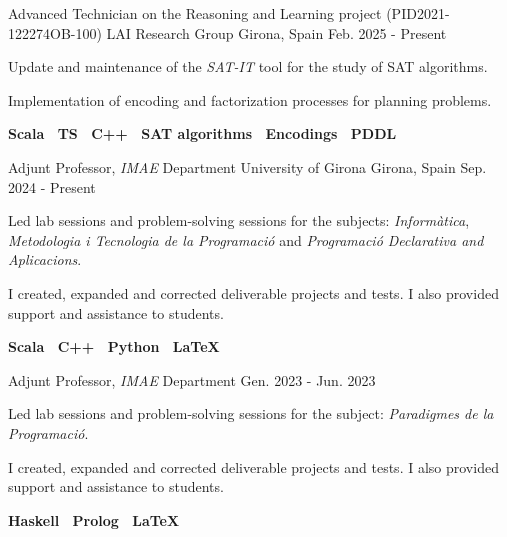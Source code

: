 

\begin{cventries}


  \cventry
  {Advanced Technician on the Reasoning and Learning project (PID2021-122274OB-100)} %
  {LAI Research Group} %
  {Girona, Spain} %
  {Feb. 2025 - Present} %
  {
  \begin{cvitems}
    \item {Update and maintenance of the \textit{SAT-IT} tool for the study of SAT algorithms.}
    \item {Implementation of encoding and factorization processes for planning problems.}
    \item {
      \textbf{
        Scala \textbar \
        TS \textbar \
        C++ \textbar \
        SAT algorithms \textbar \
        Encodings \textbar \
        PDDL
      }
    }
  \end{cvitems}
  }

  \cventry
    {Adjunt Professor, \textit{IMAE} Department}
    {University of Girona}
    {Girona, Spain}
    {Sep. 2024 - Present}
    {
    \begin{cvitems}
    \item{Led lab sessions and problem-solving sessions for the subjects: \textit{Informàtica}, \textit{Metodologia i Tecnologia de la Programació} and \textit{Programació Declarativa and Aplicacions}.}
    \item{I created, expanded and corrected deliverable projects and tests. I also provided support and assistance to students.}
    \item {
      \textbf{
        Scala \textbar \
        C++ \textbar \
        Python \textbar \
        \LaTeX
      }
    }
    \end{cvitems}
  }
  \cventry
    {Adjunt Professor, \textit{IMAE} Department}
    {} %
    {} %
    {Gen. 2023 - Jun. 2023} %
    {
    \begin{cvitems}
    \item{Led lab sessions and problem-solving sessions for the subject: \textit{Paradigmes de la Programació}.}
    \item{I created, expanded and corrected deliverable projects and tests. I also provided support and assistance to students.}
    \item {
      \textbf{
        Haskell \textbar \
        Prolog \textbar \
        \LaTeX
      }
    }
    \end{cvitems}
    \vspace{0.25cm}
 	  }



\end{cventries}
